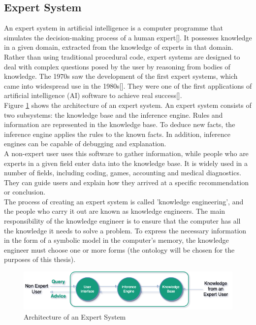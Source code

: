 \subsection{Expert System}
An expert system in artificial intelligence is a computer programme that simulates the decision-making process of a human expert[]. It possesses knowledge in a given domain, extracted from the knowledge of experts in that domain.  Rather than using traditional procedural code, expert systems are designed to deal with complex questions posed by the user by reasoning from bodies of knowledge. The 1970s saw the development of the first expert systems, which came into widespread use in the 1980s[]. They were one of the first applications of artificial intelligence (AI) software to achieve real success[]. \\

Figure \ref{fig:es-archi} shows the architecture of an expert system. An expert system consists of two subsystems: the knowledge base and the inference engine. Rules and information are represented in the knowledge base. To deduce new facts, the inference engine applies the rules to the known facts. In addition, inference engines can be capable of debugging and explanation.\\

A non-expert user uses this software to gather information, while people who are experts in a given field enter data into the knowledge base. It is widely used in a number of fields, including coding, games, accounting and medical diagnostics. They can guide users and explain how they arrived at a specific recommendation or conclusion.\\

The process of creating an expert system is called 'knowledge engineering', and the people who carry it out are known as knowledge engineers. The main responsibility of the knowledge engineer is to ensure that the computer has all the knowledge it needs to solve a problem. To express the necessary information in the form of a symbolic model in the computer's memory, the knowledge engineer must choose one or more forms (the ontology will be chosen for the purposes of this thesis).\\

\begin{figure}[H]
    \centering
    \includegraphics[scale=0.6]{images/Foundation-Architecture_Expert_System.drawio.png}
    \caption{\label{fig:es-archi} Architecture of an Expert System }
\end{figure}

